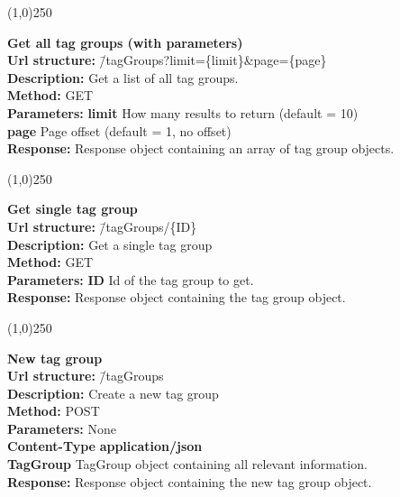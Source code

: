 \documentclass[11pt]{article}
\begin{document}
\begin{center}\line(1,0){250}\end{center}

\begin{tabbing}
\textbf{Get all tag groups (with parameters)} \\
\textcolor{black!60}{\textbf{Url structure:}} \hspace{0.2in} \= /tagGroups?limit=\{limit\}\&page=\{page\} \\
\textcolor{black!60}{\textbf{Description:}}  \> Get a list of all tag groups. \\
\textcolor{black!60}{\textbf{Method:}} \> GET \\
\textcolor{black!60}{\textbf{Parameters:}} \> \textbf{limit} How many results to return (default = 10) \\
\> \textbf{page} Page offset (default = 1, no offset) \\
\textcolor{black!60}{\textbf{Response:}} \> Response object containing an array of tag group objects.
\end{tabbing}

\begin{center}\line(1,0){250}\end{center}

\begin{tabbing}
\textbf{Get single tag group} \\
\textcolor{black!60}{\textbf{Url structure:}} \hspace{0.2in} \= /tagGroups/\{ID\} \\
\textcolor{black!60}{\textbf{Description:}}  \> Get a single tag group \\
\textcolor{black!60}{\textbf{Method:}} \> GET \\
\textcolor{black!60}{\textbf{Parameters:}} \> \textbf{ID} Id of the tag group to get. \\
\textcolor{black!60}{\textbf{Response:}} \> Response object containing the tag group object.
\end{tabbing}

\begin{center}\line(1,0){250}\end{center}

\begin{tabbing}
\textbf{New tag group} \\
\textcolor{black!60}{\textbf{Url structure:}} \hspace{0.2in} \= /tagGroups \\
\textcolor{black!60}{\textbf{Description:}}  \> Create a new tag group \\
\textcolor{black!60}{\textbf{Method:}} \> POST \\
\textcolor{black!60}{\textbf{Parameters:}} \> None \\
\textcolor{black!60}{\textbf{Content-Type}} \> \textbf{application/json} \\
\> \textbf{TagGroup} TagGroup object containing all relevant information.\\
\textcolor{black!60}{\textbf{Response:}} \> Response object containing the new tag group object.
\end{tabbing}
\end{document}
